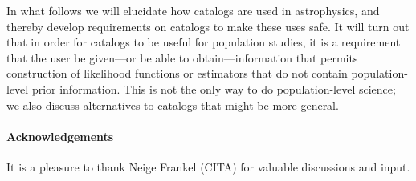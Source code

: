 \documentclass[10pt]{article}
\begin{document}
In what follows we will elucidate how catalogs are used in astrophysics, and thereby develop requirements on catalogs to make these uses safe.
It will turn out that in order for catalogs to be useful for population studies, it is a requirement that the user be given---or be able to obtain---information that permits construction of likelihood functions or estimators that do not contain population-level prior information.
This is not the only way to do population-level science; we also discuss alternatives to catalogs that might be more general.

\paragraph{Acknowledgements}
It is a pleasure to thank
  Neige Frankel (CITA)
for valuable discussions and input.


\raggedright

\end{document}
